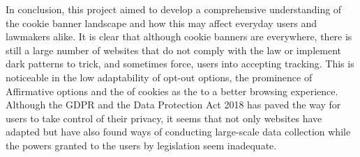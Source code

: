 \documentclass[../main.tex]{subfiles}
\begin{document}
In conclusion, this project aimed to develop a comprehensive understanding of the cookie banner landscape and how this may affect everyday users and lawmakers alike. It is clear that although cookie banners are everywhere, there is still a large number of websites that do not comply with the law or implement dark patterns to trick, and sometimes force, users into accepting tracking. This is noticeable in the low adaptability of opt-out options, the prominence of Affirmative options and the  of cookies as the  to a better browsing experience. Although the GDPR and the Data Protection Act 2018 has paved the way for users to take control of their privacy, it seems that not only websites have adapted but have also found ways of conducting large-scale data collection while the powers granted to the users by legislation seem inadequate.  
\end{document}
